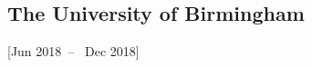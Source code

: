 \documentclass{mycv}
\begin{document}






\subsection{The University of Birmingham}[Jun 2018~--~ Dec 2018]

\end{document}
